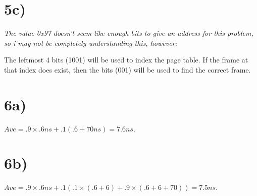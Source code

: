\documentclass[a4paper,11pt]{article}
\begin{document}
\section*{5c)}
{\it The value 0x97 doesn't seem like enough bits to give an address for this problem, so i may not be completely understanding this, however:}

The leftmost 4 bits (1001) will be used to 
index the page table.  If the frame at that index does exist, then the bits (001) will be used to find the correct frame.  



\section*{6a)}
$ Ave = .9 \times .6ns + .1 (.6 + 70ns) = 7.6 ns$.

\section*{6b)}
$ Ave = .9 \times .6ns + .1 (.1 \times (.6 + 6) + .9 \times (.6 + 6 + 70)) = 7.5 ns$.

\end{document}

